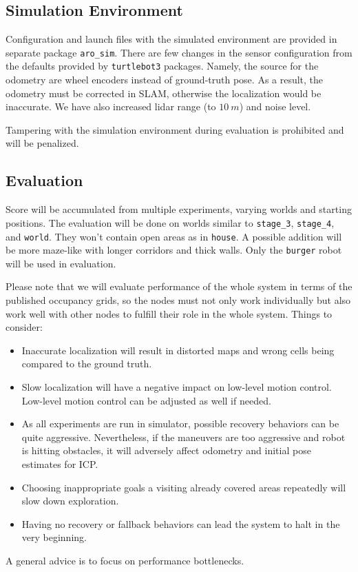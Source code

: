 \documentclass[a4paper]{article}
\newcommand{\file}[1]{\texttt{#1}}
\begin{document}
\subsection{Simulation Environment}

Configuration and launch files with the simulated environment are provided in separate package \file{aro_sim}.
There are few changes in the sensor configuration from the defaults provided by \file{turtlebot3} packages.
Namely, the source for the odometry are wheel encoders instead of ground-truth pose.
As a result, the odometry must be corrected in SLAM, otherwise the localization would be inaccurate.
We have also increased lidar range (to $\SI{10}{m}$) and noise level.

Tampering with the simulation environment during evaluation is prohibited and will be penalized.

\subsection{Evaluation}

Score will be accumulated from multiple experiments, varying worlds and starting positions.
The evaluation will be done on worlds similar to \file{stage_3}, \file{stage_4}, and \file{world}.
They won't contain open areas as in \file{house}.
A possible addition will be more maze-like with longer corridors and thick walls.
Only the \file{burger} robot will be used in evaluation.

Please note that we will evaluate performance of the whole system in terms of the published occupancy grids, so the nodes must not only work individually but also work well with other nodes to fulfill their role in the whole system.
Things to consider:
\begin{itemize}\itemsep0em
\item Inaccurate localization will result in distorted maps and wrong cells being compared to the ground truth.
\item Slow localization will have a negative impact on low-level motion control.
Low-level motion control can be adjusted as well if needed.
\item As all experiments are run in simulator, possible recovery behaviors can be quite aggressive.
Nevertheless, if the maneuvers are too aggressive and robot is hitting obstacles, it will adversely affect odometry and initial pose estimates for ICP.
\item Choosing inappropriate goals a visiting already covered areas repeatedly will slow down exploration.
\item Having no recovery or fallback behaviors can lead the system to halt in the very beginning.
\end{itemize}
A general advice is to focus on performance bottlenecks.
\end{document}
